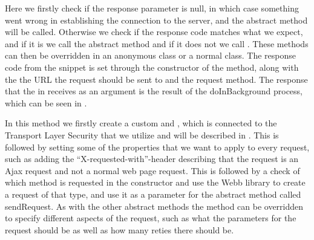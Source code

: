 
\FloatBarrier

Here we firstly check if the response parameter is null, in which case something went wrong in establishing the connection to the server, and the abstract method  will be called. Otherwise we check if the response code matches what we expect, and if it is we call the abstract method  and if it does not we call . These methods can then be overridden in an anonymous class or a normal class. The response code from the snippet is set through the constructor of the method, along with the the URL the request should be sent to and the request method. The response that the  in  receives as an argument is the result of the doInBackground process, which can be seen in . 


\FloatBarrier

In this method we firstly create a custom  and , which is connected to the Transport Layer Security that we utilize and will be described in . This is followed by setting some of the properties that we want to apply to every request, such as adding the ``X-requested-with''-header describing that the request is an Ajax request and not a normal web page request. This is followed by a check of which method is requested in the constructor and use the Webb library to create a request of that type, and use it as a parameter for the abstract method called sendRequest. As with the other abstract methods the  method can be overridden to specify different aspects of the request, such as what the parameters for the request should be as well as how many reties there should be.